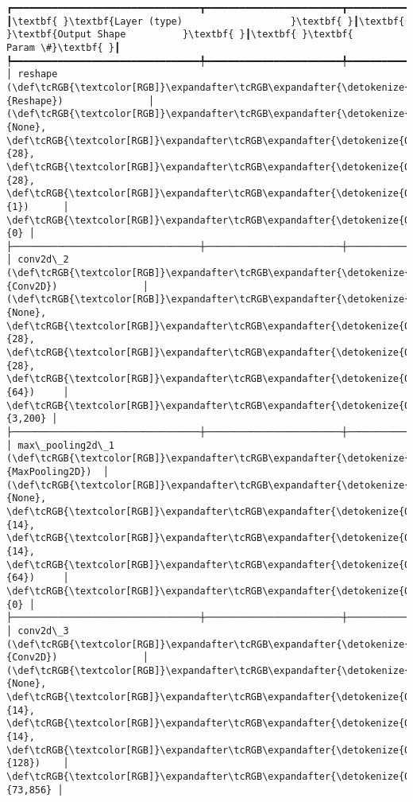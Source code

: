 \documentclass[12pt letter]{report}
\begin{document}
    
    
    \begin{Verbatim}[commandchars=\\\{\}]
┏━━━━━━━━━━━━━━━━━━━━━━━━━━━━━━━━━┳━━━━━━━━━━━━━━━━━━━━━━━━┳━━━━━━━━━━━━━━━┓
┃\textbf{ }\textbf{Layer (type)                   }\textbf{ }┃\textbf{ }\textbf{Output Shape          }\textbf{ }┃\textbf{ }\textbf{      Param \#}\textbf{ }┃
┡━━━━━━━━━━━━━━━━━━━━━━━━━━━━━━━━━╇━━━━━━━━━━━━━━━━━━━━━━━━╇━━━━━━━━━━━━━━━┩
│ reshape (\def\tcRGB{\textcolor[RGB]}\expandafter\tcRGB\expandafter{\detokenize{0,135,255}}{Reshape})               │ (\def\tcRGB{\textcolor[RGB]}\expandafter\tcRGB\expandafter{\detokenize{0,215,255}}{None}, \def\tcRGB{\textcolor[RGB]}\expandafter\tcRGB\expandafter{\detokenize{0,175,0}}{28}, \def\tcRGB{\textcolor[RGB]}\expandafter\tcRGB\expandafter{\detokenize{0,175,0}}{28}, \def\tcRGB{\textcolor[RGB]}\expandafter\tcRGB\expandafter{\detokenize{0,175,0}}{1})      │             \def\tcRGB{\textcolor[RGB]}\expandafter\tcRGB\expandafter{\detokenize{0,175,0}}{0} │
├─────────────────────────────────┼────────────────────────┼───────────────┤
│ conv2d\_2 (\def\tcRGB{\textcolor[RGB]}\expandafter\tcRGB\expandafter{\detokenize{0,135,255}}{Conv2D})               │ (\def\tcRGB{\textcolor[RGB]}\expandafter\tcRGB\expandafter{\detokenize{0,215,255}}{None}, \def\tcRGB{\textcolor[RGB]}\expandafter\tcRGB\expandafter{\detokenize{0,175,0}}{28}, \def\tcRGB{\textcolor[RGB]}\expandafter\tcRGB\expandafter{\detokenize{0,175,0}}{28}, \def\tcRGB{\textcolor[RGB]}\expandafter\tcRGB\expandafter{\detokenize{0,175,0}}{64})     │         \def\tcRGB{\textcolor[RGB]}\expandafter\tcRGB\expandafter{\detokenize{0,175,0}}{3,200} │
├─────────────────────────────────┼────────────────────────┼───────────────┤
│ max\_pooling2d\_1 (\def\tcRGB{\textcolor[RGB]}\expandafter\tcRGB\expandafter{\detokenize{0,135,255}}{MaxPooling2D})  │ (\def\tcRGB{\textcolor[RGB]}\expandafter\tcRGB\expandafter{\detokenize{0,215,255}}{None}, \def\tcRGB{\textcolor[RGB]}\expandafter\tcRGB\expandafter{\detokenize{0,175,0}}{14}, \def\tcRGB{\textcolor[RGB]}\expandafter\tcRGB\expandafter{\detokenize{0,175,0}}{14}, \def\tcRGB{\textcolor[RGB]}\expandafter\tcRGB\expandafter{\detokenize{0,175,0}}{64})     │             \def\tcRGB{\textcolor[RGB]}\expandafter\tcRGB\expandafter{\detokenize{0,175,0}}{0} │
├─────────────────────────────────┼────────────────────────┼───────────────┤
│ conv2d\_3 (\def\tcRGB{\textcolor[RGB]}\expandafter\tcRGB\expandafter{\detokenize{0,135,255}}{Conv2D})               │ (\def\tcRGB{\textcolor[RGB]}\expandafter\tcRGB\expandafter{\detokenize{0,215,255}}{None}, \def\tcRGB{\textcolor[RGB]}\expandafter\tcRGB\expandafter{\detokenize{0,175,0}}{14}, \def\tcRGB{\textcolor[RGB]}\expandafter\tcRGB\expandafter{\detokenize{0,175,0}}{14}, \def\tcRGB{\textcolor[RGB]}\expandafter\tcRGB\expandafter{\detokenize{0,175,0}}{128})    │        \def\tcRGB{\textcolor[RGB]}\expandafter\tcRGB\expandafter{\detokenize{0,175,0}}{73,856} │

\end{Verbatim}
\end{document}
